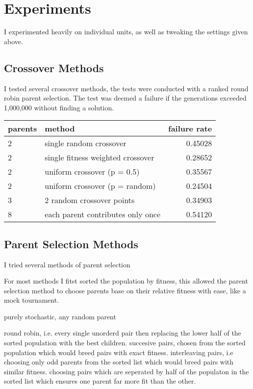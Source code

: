 \documentclass[a4paper,11pt]{article}
\begin{document}
\pagebreak
\section*{Experiments}
I experimented heavily on individual units, as well as tweaking the settings given above.

\subsection*{Crossover Methods}

I tested several crossover methods, the tests were conducted with a ranked round robin parent selection.
The test was deemed a failure if the generations exceeded 1,000,000 without finding a solution.


\begin{tabular}{l | l | r }
parents & method & failure rate \\ \hline
2 & single random crossover & 0.45028 \\
2 & single fitness weighted crossover & 0.28652 \\
2 & uniform crossover (p = 0.5) & 0.35567 \\
2 & uniform crossover (p = random) & 0.24504 \\
3 & 2 random crossover points & 0.34903 \\
8 & each parent contributes only once & 0.54120 \\
\end{tabular}

\subsection*{Parent Selection Methods}

I tried several methods of parent selection

For most methods I fitst sorted the population by fitness, this allowed the parent selection method to choose parents base on their relative fitness with ease, like a mock tournament.

purely stochastic, any random parent

round robin, i.e. every single unorderd pair
then replacing the lower half of the sorted population with the best children.  
succesive pairs, chosen from the sorted population
which would breed pairs with exact fitness.
interleaving pairs, i.e choosing only odd parents from the sorted list
which would breed pairs with similar fitness.
choosing pairs which are seperated by half of the populaton in the sorted list
which ensures one parent far more fit than the other.
\end{document}
